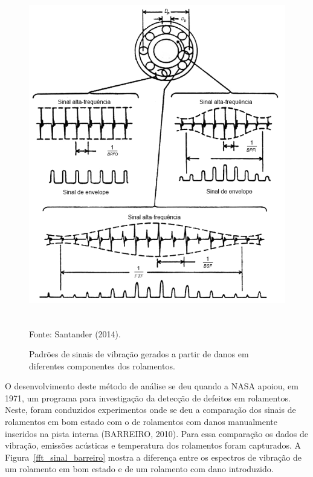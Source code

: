 \documentclass[
	12pt,				
	oneside,			
	a4paper,			
	english,			
	brazil,	
	sumario=abnt-6027-2012		
	]{abntex2ppgsi}
\begin{document}
\begin{figure}[!htb]
\centering
\caption {Padrões de sinais de vibração gerados a partir de danos em diferentes componentes dos rolamentos.}
\includegraphics[width=\textwidth,height=150mm,keepaspectratio]{frequencias_sinais_rolamentos} \\
Fonte: Santander (2014).
\label{frequencias_sinais_rolamentos}
\end{figure}

O desenvolvimento deste método de análise se deu quando a NASA apoiou, em 1971, um programa para investigação da detecção de defeitos em rolamentos. Neste, foram conduzidos experimentos onde se deu a comparação dos sinais de rolamentos em bom estado com o de rolamentos com danos manualmente inseridos na pista interna (BARREIRO, 2010). Para essa comparação os dados de vibração, emissões acústicas e temperatura dos rolamentos foram capturados. A Figura~\ref{fft_sinal_barreiro} mostra a diferença entre os espectros de vibração de um rolamento em bom estado e de um rolamento com dano introduzido.
\end{document}
